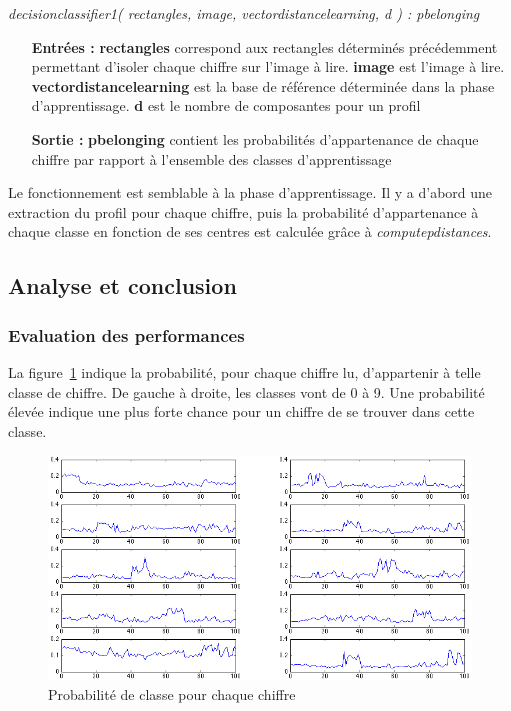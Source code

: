 \textit{decisionclassifier1( rectangles, image, vectordistancelearning, d ) : pbelonging}\\
\begin{itemize}
	\item[\textbf{Entrées :}] \textbf{rectangles} correspond aux rectangles déterminés précédemment permettant d'isoler chaque chiffre sur l'image à lire. \textbf{image} est l'image à lire. \textbf{vectordistancelearning} est la base de référence déterminée dans la phase d'apprentissage. \textbf{d} est le nombre de composantes pour un profil
	\item[\textbf{Sortie :}] \textbf{pbelonging} contient les probabilités d'appartenance de chaque chiffre par rapport à l'ensemble des classes d'apprentissage
\end{itemize}
Le fonctionnement est semblable à la phase d'apprentissage. Il y a d'abord une extraction du profil pour chaque chiffre, puis la probabilité d'appartenance à chaque classe en fonction de ses centres est calculée grâce à \textit{computepdistances}.

\subsection{Analyse et conclusion}
\subsubsection{Evaluation des performances}
La figure~\ref{fig:proba1} indique la probabilité, pour chaque chiffre lu, d'appartenir à telle classe de chiffre. De gauche à droite, les classes vont de 0 à 9. Une probabilité élevée indique une plus forte chance pour un chiffre de se trouver dans cette classe.

\begin{figure}[hm]
	\begin{center}
		\includegraphics[width=\textwidth]{img/20-pbelonging1.png}
	\end{center}
	\caption{Probabilité de classe pour chaque chiffre}
	\label{fig:proba1}
\end{figure}

